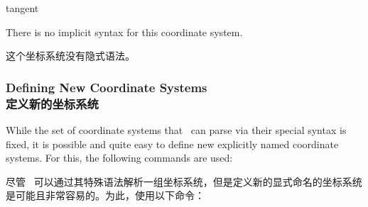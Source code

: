 \begin{coordinatesystem}{tangent}
\begin{codeexample}[preamble={\usetikzlibrary{calc}}]
\end{codeexample}

    There is no implicit syntax for this coordinate system.

    这个坐标系统没有隐式语法。

\end{coordinatesystem}


\subsubsection{Defining New Coordinate Systems\\定义新的坐标系统}

While the set of coordinate systems that \tikzname\ can parse via their special
syntax is fixed, it is possible and quite easy to define new explicitly named
coordinate systems. For this, the following commands are used:

尽管 \tikzname\ 可以通过其特殊语法解析一组坐标系统，但是定义新的显式命名的坐标系统是可能且非常容易的。为此，使用以下命令：

